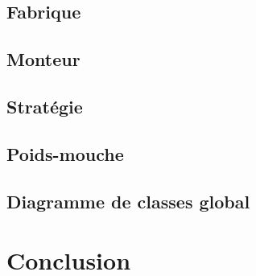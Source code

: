 \documentclass[a4paper]{article}
\begin{document}
	\subsection{Fabrique}

	\subsection{Monteur}
	
	\subsection{Stratégie}
	
	\subsection{Poids-mouche}
	
	\subsection{Diagramme de classes global}
	
	
\section{Conclusion}
\newpage
\listoffigures
\end{document}

